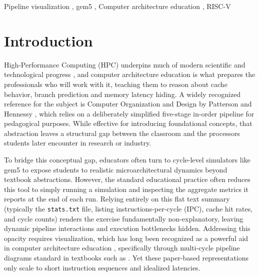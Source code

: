 \documentclass{ceurart}
\begin{document}
\begin{keywords}
  Pipeline visualization \sep
  gem5 \sep
  Computer architecture education \sep
  RISC-V
\end{keywords}

\maketitle

\section{Introduction}

High-Performance Computing (HPC) underpins much of modern scientific and technological progress \cite{dongarra2011international}, and computer architecture education is what prepares the professionals who will work with it, teaching them to reason about cache behavior, branch prediction and memory latency hiding. A widely recognized reference for the subject is Computer Organization and Design by Patterson and Hennessy \cite{patterson2020computer}, which relies on a deliberately simplified five-stage in-order pipeline for pedagogical purposes. While effective for introducing foundational concepts, that abstraction leaves a structural gap between the classroom and the processors students later encounter in research or industry.

To bridge this conceptual gap, educators often turn to cycle-level simulators like gem5 \cite{binkert2011gem5} to expose students to realistic microarchitectural dynamics beyond textbook abstractions. However, the standard educational practice often reduces this tool to simply running a simulation and inspecting the aggregate metrics it reports at the end of each run. Relying entirely on this flat text summary (typically the \texttt{stats.txt} file, listing instructions-per-cycle (IPC), cache hit rates, and cycle counts) renders the exercise fundamentally non-explanatory, leaving dynamic pipeline interactions and execution bottlenecks hidden. Addressing this opacity requires visualization, which has long been recognized as a powerful aid in computer architecture education \cite{yehezkel2007contribution,yeh2023visualization}, specifically through multi-cycle pipeline diagrams standard in textbooks such as \cite{patterson2020computer}. Yet these paper-based representations only scale to short instruction sequences and idealized latencies. 
\end{document}
